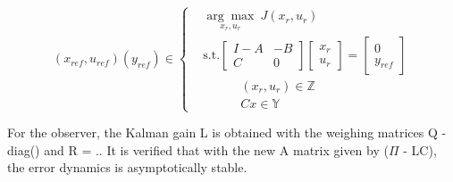 \begin{equation}
(x_{ref}, u_{ref})(y_{ref}) \in
\begin{cases}
& \underset{x_r, u_r}{\arg\max} \: J(x_r, u_r)\\
& \text{s.t.} \begin{bmatrix}
                    I-A & -B \\
                    C & 0
                \end{bmatrix}
                \begin{bmatrix}
                x_r \\ u_r
                \end{bmatrix}
                =
                \begin{bmatrix}
                0 \\ y_{ref}
                \end{bmatrix}\\
& \quad\quad\quad  (x_r, u_r) \in \mathbb{Z} \\
& \quad\quad\quad Cx \in \mathbb{Y}
\end{cases}
\end{equation}

For the observer, the Kalman gain L is obtained with the weighing matrices Q - diag() and R = .. It is verified that with the new A matrix given by ($\Pi$ - LC), the error dynamics is asymptotically stable. 
